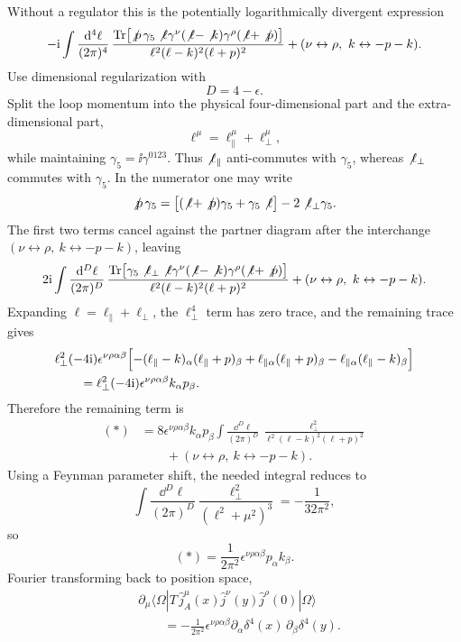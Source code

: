 Without a regulator this is the potentially logarithmically divergent
expression
\[
  -\mathrm{i}
  \int\frac{\mathrm{d}^4\ell}{(2\pi)^4}\,
  \frac{
    \operatorname{Tr}\bigl[
      \not p\,\gamma_5\not\ell\gamma^\nu
      (\not\ell-\not k)\gamma^\rho(\not\ell+\not p)
    \bigr]
  }{
    \ell^2(\ell-k)^2(\ell+p)^2
  }
  +(\nu\leftrightarrow\rho,\ k\leftrightarrow -p-k).
\]
Use dimensional regularization with
\[
  D=4-\epsilon .
\]
Split the loop momentum into the physical four-dimensional part and the
extra-dimensional part,
\[
  \ell^\mu=\ell_\parallel^\mu+\ell_\perp^\mu,
\]
while maintaining
\(\gamma_5=\ii\gamma^{0123}\).  Thus \(\not\ell_\parallel\)
anti-commutes with \(\gamma_5\), whereas \(\not\ell_\perp\) commutes with
\(\gamma_5\).  In the numerator one may write
\[
  \not p\,\gamma_5
  =
  \bigl[(\not\ell+\not p)\gamma_5+\gamma_5\not\ell\bigr]
  -2\not\ell_\perp\gamma_5 .
\]
The first two terms cancel against the partner diagram after the
interchange
\((\nu\leftrightarrow\rho,\ k\leftrightarrow -p-k)\), leaving
\[
  2\mathrm{i}
  \int\frac{\mathrm{d}^D\ell}{(2\pi)^D}\,
  \frac{
    \operatorname{Tr}\bigl[
      \gamma_5\not\ell_\perp\not\ell\gamma^\nu
      (\not\ell-\not k)\gamma^\rho(\not\ell+\not p)
    \bigr]
  }{
    \ell^2(\ell-k)^2(\ell+p)^2
  }
  +(\nu\leftrightarrow\rho,\ k\leftrightarrow -p-k).
\]
Expanding \(\ell=\ell_\parallel+\ell_\perp\), the \(\ell_\perp^4\) term
has zero trace, and the remaining trace gives
\[
\begin{aligned}
  &\ell_\perp^2(-4\mathrm{i})\epsilon^{\nu\rho\alpha\beta}
  \Bigl[
    -(\ell_\parallel-k)_\alpha(\ell_\parallel+p)_\beta
    +\ell_{\parallel\alpha}(\ell_\parallel+p)_\beta
    -\ell_{\parallel\alpha}(\ell_\parallel-k)_\beta
  \Bigr]
\\
  &\qquad =
  \ell_\perp^2(-4\mathrm{i})
  \epsilon^{\nu\rho\alpha\beta}k_\alpha p_\beta .
\end{aligned}
\]
Therefore the remaining term is
\[
\begin{aligned}
  (*) &=
  8\epsilon^{\nu\rho\alpha\beta}k_\alpha p_\beta
  \int\frac{\dd^D\ell}{(2\pi)^D}\,
  \frac{\ell_\perp^2}{\ell^2(\ell-k)^2(\ell+p)^2}
\\
  &\qquad
  +(\nu\leftrightarrow\rho,\ k\leftrightarrow -p-k).
\end{aligned}
\]
Using a Feynman parameter shift, the needed integral reduces to
\[
  \int\frac{\dd^D\ell}{(2\pi)^D}
  \frac{\ell_\perp^2}{(\ell^2+\mu^2)^3}
  =
  -\frac1{32\pi^2},
\]
so
\[
  (*)=\frac1{2\pi^2}
  \epsilon^{\nu\rho\alpha\beta}p_\alpha k_\beta .
\]
Fourier transforming back to position space,
\[
\begin{aligned}
  &\partial_\mu
  \langle\Omega|
  T\,\widehat j_A^\mu(x)\widehat j^\nu(y)\widehat j^\rho(0)
  |\Omega\rangle
\\
  &\qquad =
  -\frac1{2\pi^2}
  \epsilon^{\nu\rho\alpha\beta}
  \partial_\alpha\delta^4(x)\,
  \partial_\beta\delta^4(y).
\end{aligned}
\]

